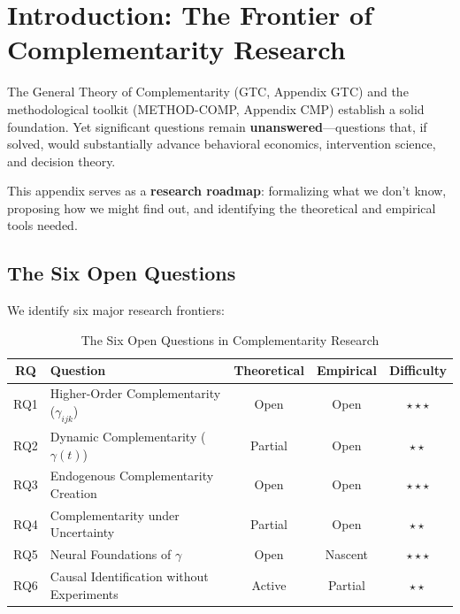 \section{Introduction: The Frontier of Complementarity Research}
\label{sec:research-intro}

\begin{tcolorbox}[colback=blue!5!white,colframe=blue!75!black,title=\textbf{Fundamental Motivation}]
The General Theory of Complementarity (GTC, Appendix GTC) and the methodological toolkit (METHOD-COMP, Appendix CMP) establish a solid foundation. Yet significant questions remain \textbf{unanswered}---questions that, if solved, would substantially advance behavioral economics, intervention science, and decision theory.

This appendix serves as a \textbf{research roadmap}: formalizing what we don't know, proposing how we might find out, and identifying the theoretical and empirical tools needed.
\end{tcolorbox}

\subsection{The Six Open Questions}

We identify six major research frontiers:

\begin{table}[h]
\centering
\caption{The Six Open Questions in Complementarity Research}
\label{tab:six-questions}
\renewcommand{\arraystretch}{1.4}
\begin{tabular}{@{}clccc@{}}
\toprule
\textbf{RQ} & \textbf{Question} & \textbf{Theoretical} & \textbf{Empirical} & \textbf{Difficulty} \\
\midrule
RQ1 & Higher-Order Complementarity ($\gamma_{ijk}$) & Open & Open & $\star\star\star$ \\
RQ2 & Dynamic Complementarity ($\gamma(t)$) & Partial & Open & $\star\star$ \\
RQ3 & Endogenous Complementarity Creation & Open & Open & $\star\star\star$ \\
RQ4 & Complementarity under Uncertainty & Partial & Open & $\star\star$ \\
RQ5 & Neural Foundations of $\gamma$ & Open & Nascent & $\star\star\star$ \\
RQ6 & Causal Identification without Experiments & Active & Partial & $\star\star$ \\
\bottomrule
\end{tabular}
\end{table}

